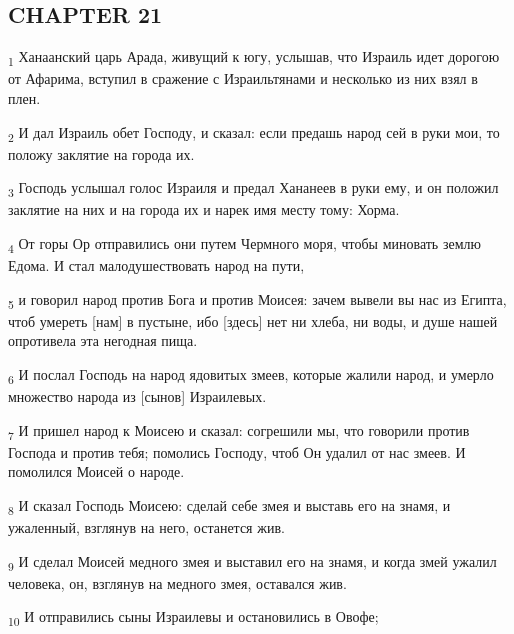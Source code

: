 \subsection{CHAPTER 21}
\begin{tcolorbox}
\textsubscript{1} Ханаанский царь Арада, живущий к югу, услышав, что Израиль идет дорогою от Афарима, вступил в сражение с Израильтянами и несколько из них взял в плен.
\end{tcolorbox}
\begin{tcolorbox}
\textsubscript{2} И дал Израиль обет Господу, и сказал: если предашь народ сей в руки мои, то положу заклятие на города их.
\end{tcolorbox}
\begin{tcolorbox}
\textsubscript{3} Господь услышал голос Израиля и предал Хананеев в руки ему, и он положил заклятие на них и на города их и нарек имя месту тому: Хорма.
\end{tcolorbox}
\begin{tcolorbox}
\textsubscript{4} От горы Ор отправились они путем Чермного моря, чтобы миновать землю Едома. И стал малодушествовать народ на пути,
\end{tcolorbox}
\begin{tcolorbox}
\textsubscript{5} и говорил народ против Бога и против Моисея: зачем вывели вы нас из Египта, чтоб умереть [нам] в пустыне, ибо [здесь] нет ни хлеба, ни воды, и душе нашей опротивела эта негодная пища.
\end{tcolorbox}
\begin{tcolorbox}
\textsubscript{6} И послал Господь на народ ядовитых змеев, которые жалили народ, и умерло множество народа из [сынов] Израилевых.
\end{tcolorbox}
\begin{tcolorbox}
\textsubscript{7} И пришел народ к Моисею и сказал: согрешили мы, что говорили против Господа и против тебя; помолись Господу, чтоб Он удалил от нас змеев. И помолился Моисей о народе.
\end{tcolorbox}
\begin{tcolorbox}
\textsubscript{8} И сказал Господь Моисею: сделай себе змея и выставь его на знамя, и ужаленный, взглянув на него, останется жив.
\end{tcolorbox}
\begin{tcolorbox}
\textsubscript{9} И сделал Моисей медного змея и выставил его на знамя, и когда змей ужалил человека, он, взглянув на медного змея, оставался жив.
\end{tcolorbox}
\begin{tcolorbox}
\textsubscript{10} И отправились сыны Израилевы и остановились в Овофе;
\end{tcolorbox}
